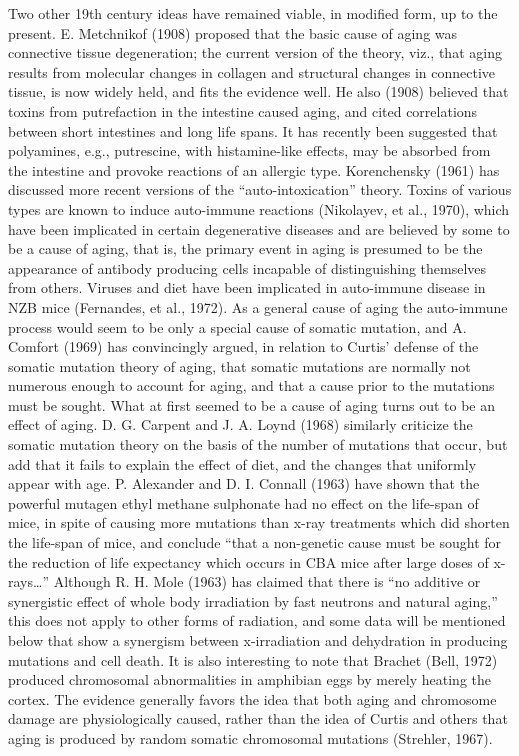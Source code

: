 Two other 19th century ideas have remained viable, in modified
form, up to the present. E. Metchnikof (1908) proposed that the
basic cause of aging was connective tissue degeneration; the current
version of the theory, viz., that aging results from molecular
changes in collagen and structural changes in connective tissue, is
now widely held, and fits the evidence well. He also (1908) believed
that toxins from putrefaction in the intestine caused aging, and cited
correlations between short intestines and long life spans. It has recently
been suggested that polyamines, e.g., putrescine, with histamine-like effects, may
be absorbed from the intestine and provoke reactions of an allergic type. Korenchensky
(1961) has discussed more recent versions of the ``auto-intoxication'' theory. Toxins 
of various types are known to induce auto-immune reactions (Nikolayev, et al., 1970), which
have been implicated in certain degenerative diseases and are believed by some to be a cause
of aging, that is, the primary event in aging is presumed to be the appearance of antibody
producing cells incapable of distinguishing themselves from others. Viruses and diet have been
implicated in auto-immune disease in NZB mice (Fernandes, et al., 1972). As a general cause of 
aging the auto-immune process would seem to be only a special cause of somatic mutation, and A. Comfort
(1969) has convincingly argued, in relation to Curtis' defense of the somatic mutation theory of
aging, that somatic mutations are normally not numerous enough to account for aging, and that a cause 
prior to the mutations must be sought. What at first seemed to be a cause of aging turns out to be
an effect of aging. D. G. Carpent and J. A. Loynd (1968) similarly criticize the somatic mutation theory
on the basis of the number of mutations that occur, but add that it fails to explain the effect of diet, and the
changes that uniformly appear with age. P. Alexander and D. I. Connall (1963) have shown that the powerful mutagen
ethyl methane sulphonate had no effect on the life-span of mice, in spite of causing more mutations than x-ray
treatments which did shorten the life-span of mice, and conclude ``that a non-genetic cause must be sought for the
reduction of life expectancy which occurs in CBA mice after large doses of x-rays\dots'' Although R. H. Mole (1963) has
claimed that there is ``no additive or synergistic effect of whole body irradiation by fast neutrons and natural aging,'' this
does not apply to other forms of radiation, and some data will be mentioned below that show a synergism between x-irradiation and
dehydration in producing mutations and cell death. It is also interesting to note that Brachet (Bell, 1972) produced
chromosomal abnormalities in amphibian eggs by merely heating the cortex. The evidence generally favors the idea
that both aging and chromosome damage are physiologically caused, rather than the idea of Curtis and others that aging
is produced by random somatic chromosomal mutations (Strehler, 1967).

